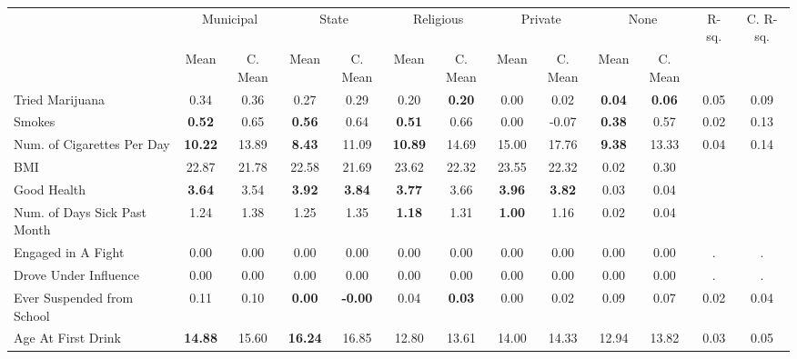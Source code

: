\begin{tabular}{l c c c c c c c c c c c c}
\toprule
& \multicolumn{2}{c}{Municipal} & \multicolumn{2}{c}{State} & \multicolumn{2}{c}{Religious} & \multicolumn{2}{c}{Private} & \multicolumn{2}{c}{None} & R-sq. & C. R-sq. \\
& \scriptsize Mean & \scriptsize C. Mean & \scriptsize Mean & \scriptsize C. Mean & \scriptsize Mean & \scriptsize C. Mean & \scriptsize Mean & \scriptsize C. Mean & \scriptsize Mean & \scriptsize C. Mean & & \\
\midrule
Tried Marijuana &      0.34 & 0.36 &      0.27 & 0.29 &      0.20 & \textbf{     0.20} &      0.00 & 0.02 & \textbf{     0.04} & \textbf{     0.06} &      0.05 &      0.09 \\
Smokes & \textbf{     0.52} & 0.65 & \textbf{     0.56} & 0.64 & \textbf{     0.51} & 0.66 &      0.00 & -0.07 & \textbf{     0.38} & 0.57 &      0.02 &      0.13 \\
Num. of Cigarettes Per Day & \textbf{    10.22} & 13.89 & \textbf{     8.43} & 11.09 & \textbf{    10.89} & 14.69 &     15.00 & 17.76 & \textbf{     9.38} & 13.33 &      0.04 &      0.14 \\
BMI &     22.87 & 21.78 &     22.58 & 21.69 &     23.62 & 22.32 &     23.55 & 22.32 &      0.02 &      0.30 \\
Good Health & \textbf{     3.64} & 3.54 & \textbf{     3.92} & \textbf{     3.84} & \textbf{     3.77} & 3.66 & \textbf{     3.96} & \textbf{     3.82} &      0.03 &      0.04 \\
Num. of Days Sick Past Month &      1.24 & 1.38 &      1.25 & 1.35 & \textbf{     1.18} & 1.31 & \textbf{     1.00} & 1.16 &      0.02 &      0.04 \\
Engaged in A Fight &      0.00 & 0.00 &      0.00 & 0.00 &      0.00 & 0.00 &      0.00 & 0.00 &      0.00 & 0.00 &         . &         . \\
Drove Under Influence &      0.00 & 0.00 &      0.00 & 0.00 &      0.00 & 0.00 &      0.00 & 0.00 &      0.00 & 0.00 &         . &         . \\
Ever Suspended from School &      0.11 & 0.10 & \textbf{     0.00} & \textbf{    -0.00} &      0.04 & \textbf{     0.03} &      0.00 & 0.02 &      0.09 & 0.07 &      0.02 &      0.04 \\
Age At First Drink & \textbf{    14.88} & 15.60 & \textbf{    16.24} & 16.85 &     12.80 & 13.61 &     14.00 & 14.33 &     12.94 & 13.82 &      0.03 &      0.05 \\
\bottomrule
\end{tabular}
